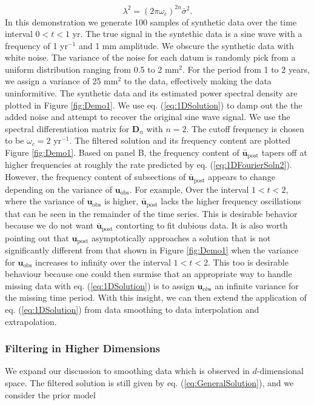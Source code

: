 \documentclass[10pt,a4paper]{article}
\begin{document}
\begin{equation}\label{eq:VariableChange2}
\lambda^2 = (2\pi\omega_c)^{2n}\bar{\sigma}^2.  
\end{equation}
In this demonstration we generate 100 samples of synthetic data over the time interval $0<t<1$ yr.  The true signal in the syntethic data is a sine wave with a frequency of 1 yr$^{-1}$ and 1 mm amplitude.  We obscure the synthetic data with white noise.  The variance of the noise for each datum is randomly pick from a uniform distribution ranging from 0.5 to 2 mm$^2$.  For the period from 1 to 2 years, we assign a variance of 25 mm$^2$ to the data, effectively making the data uninformitive.  The synthetic data and its estimated power spectral density are plotted in Figure \ref{fig:Demo1}.  We use eq. (\ref{eq:1DSolution}) to damp out the the added noise and attempt to recover the original sine wave signal.  We use the spectral differentiation matrix for $\mathbf{D}_n$ with $n=2$.  The cutoff frequency is chosen to be $\omega_c=2$ yr$^{-1}$.  The filtered solution and its frequency content are plotted Figure \ref{fig:Demo1}.  Based on panel B, the frequency content of $\mathbf{\bar{u}}_\mathrm{post}$ tapers off at higher frequencies at roughly the rate predicted by eq. (\ref{eq:1DFourierSoln2}). However, the frequency content of subsections of $\mathbf{\bar{u}}_\mathrm{post}$ appears to change depending on the variance of $\mathbf{u}_\mathrm{obs}$. For example, Over the interval $1<t<2$, where the variance of $\mathbf{u}_\mathrm{obs}$ is higher, $\mathbf{\bar{u}}_\mathrm{post}$ lacks the higher frequency oscillations that can be seen in the remainder of the time series. This is desirable behavior because we do not want $\mathbf{\bar{u}}_\mathrm{post}$ contorting to fit dubious data.  It is also worth pointing out that $\mathbf{u}_\mathrm{post}$ asymptotically approaches a solution that is not significantly different from that shown in Figure \ref{fig:Demo1} when the variance for $\mathbf{u}_\mathrm{obs}$ increases to infinity over the interval $1<t<2$.  This too is desirable behaviour because one could then surmise that an appropriate way to handle missing data with eq. (\ref{eq:1DSolution}) is to assign $\mathbf{u}_\mathrm{obs}$ an infinite variance for the missing time period.  With this insight, we can then extend the application of eq. (\ref{eq:1DSolution}) from data smoothing to data interpolation and extrapolation.   


\subsubsection{Filtering in Higher Dimensions}\label{sec:SmoothingND} 
We expand our discussion to smoothing data which is observed in $d$-dimensional space.  The filtered solution is still given by eq. (\ref{eq:GeneralSolution}), and we consider the prior model
\end{document}
